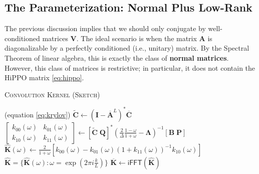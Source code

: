 \subsection{The \methodabbrv{} Parameterization: Normal Plus Low-Rank}
\label{sec:s4-overview}

The previous discussion implies that we should only conjugate by well-conditioned matrices \( \bm{V} \).
The ideal scenario is when the matrix \( \bm{A} \) is diagonalizable by a perfectly conditioned (i.e., unitary) matrix.
By the Spectral Theorem of linear algebra, this is exactly the class of \textbf{normal matrices}.
However, this class of matrices is restrictive; in particular, it does not contain the HiPPO matrix \eqref{eq:hippo}.


\begin{algorithm}[t]
  \caption{\textsc{\methodabbrv{} Convolution Kernel (Sketch)}}%
  \label{alg:s4-convolution}
  \begin{algorithmic}[1]
    \renewcommand{\algorithmicrequire}{\textbf{Input:}}
    \renewcommand{\algorithmicensure}{\textbf{Output:}}
     (equation \eqref{eq:krylov})
    \State $\bm{\widetilde{C}} \gets \left(\bm{I} - \bm{\overline{A}}^L\right)^* \bm{\overline{C}}$
    \State
    \( \begin{bmatrix} k_{00}(\omega) & k_{01}(\omega) \\ k_{10}(\omega) & k_{11}(\omega) \end{bmatrix} \gets \left[ \bm{\widetilde{C}} \; \bm{Q} \right]^* \left(\frac{2}{\Delta} \frac{1-\omega}{1+\omega} - \bm{\Lambda} \right)^{-1} \left[ \bm{B} \; \bm{P} \right] \)
    \label{step:cauchy}
    \State
    \( \bm{\hat{K}}(\omega) \gets \frac{2}{1+\omega} \left[ k_{00}(\omega) - k_{01}(\omega) (1 + k_{11}(\omega))^{-1} k_{10}(\omega) \right]  \)
    \State \( \bm{\hat{K}} = \{\bm{\hat{K}}(\omega) : \omega = \exp(2\pi i \frac{k}{L})\} \)
    \State \( \bm{\overline{K}} \gets \mathsf{iFFT} (\bm{\hat{K}}) \)
  \end{algorithmic}
\end{algorithm}


